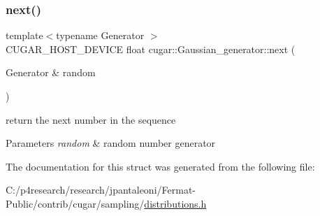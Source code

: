 \subsubsection{\texorpdfstring{next()}{next()}}
{\footnotesize\ttfamily template$<$typename Generator $>$ \\
C\+U\+G\+A\+R\+\_\+\+H\+O\+S\+T\+\_\+\+D\+E\+V\+I\+CE float cugar\+::\+Gaussian\+\_\+generator\+::next (\begin{DoxyParamCaption}\item[{Generator \&}]{random }\end{DoxyParamCaption})\hspace{0.3cm}{\ttfamily [inline]}}

return the next number in the sequence


\begin{DoxyParams}{Parameters}
{\em random} & random number generator \\
\hline
\end{DoxyParams}


The documentation for this struct was generated from the following file\+:\begin{DoxyCompactItemize}
\item 
C\+:/p4research/research/jpantaleoni/\+Fermat-\/\+Public/contrib/cugar/sampling/\hyperlink{distributions_8h}{distributions.\+h}\end{DoxyCompactItemize}
